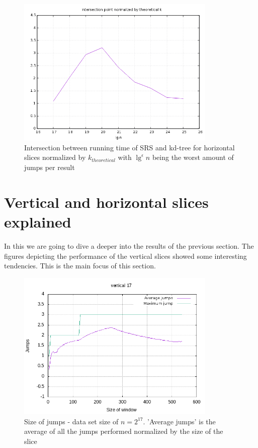 \begin{figure}[h]
    \centering
    \includegraphics[width = 0.85\textwidth]{pictures/analysis/hori_theory_worst_jump.png}
    \caption{Intersection between running time of SRS and kd-tree for horizontal slices normalized by $k_{theoretical}$ with $\lg^\epsilon n$ being the worst amount of jumps per result}\label{fig:hori_theory_worst_jump}
\end{figure}
\clearpage

\section{Vertical and horizontal slices explained}
\label{sect:verthoriexp}

In this we are going to dive a deeper into the results of the previous section. The figures depicting the performance of the vertical slices showed some interesting tendencies. This is the main focus of this section.


\begin{figure}[h]
    \centering
    \includegraphics[width = 0.85\textwidth]{pictures/analysis/jump_vert_17.png}
    \caption{Size of jumps - data set size of $n=2^{17}$. 'Average jumps' is the average of all the jumps performed normalized by the size of the slice}\label{fig:jump_vert_17}
\end{figure}

